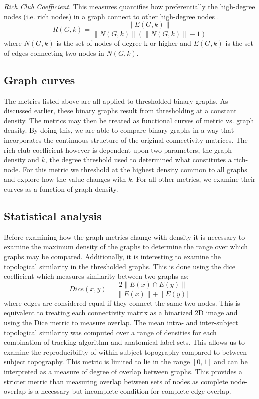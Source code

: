 \documentclass{frontiersSCNS} %
\begin{document}
\emph{Rich Club Coefficient}.
This measures quantifies how preferentially the high-degree nodes (i.e. rich nodes)  in a graph connect to other high-degree nodes \citep{Colizza2006}.
$$ R(G,k) = \frac{ \|E(G,k)\| }{ \|N(G,k)\| ( \|N(G,k)\|-1 ) } $$
where $N(G,k)$ is the set of nodes of degree k or higher and $E(G,k)$ is the set of edges connecting two nodes in $N(G,k)$.


\subsection{Graph curves}
The metrics listed above are all applied to thresholded binary graphs. As discussed earlier, these binary graphs result from thresholding at a constant density. The metrics may then be treated as functional curves of metric vs. graph density. By doing this, we are able to compare binary graphs in a way that incorporates the continuous structure of the original connectivity matrices. The rich club coefficient however is dependent upon two parameters, the graph density and $k$, the degree threshold used to determined what constitutes a rich-node. For this metric we threshold at the highest density common to all graphs and explore how the value changes with $k$. For all other metrics, we examine their curves as a function of graph density. 

\subsection{Statistical analysis}
Before examining how the graph metrics change with density it is necessary to examine the maximum density of the graphs to determine the range over which graphs may be compared. Additionally, it is interesting to examine the topological similarity in the thresholded graphs. This is done using the dice coefficient which measures similarity between two graphs as:
$$Dice(x,y) = \frac{ 2 \| E(x) \cap E(y) \| }{ \|E(x) \| + \| E(y) |\ }$$
where edges are considered equal if they connect the same two
nodes. This is equivalent to treating each connectivity matrix as
a binarized 2D image and using the Dice metric to measure overlap. The mean intra- and inter-subject topological similarity 
was computed over a range of densities for each combination of tracking algorithm and anatomical label sets. This allows us to 
examine the reproducibility of within-subject topography compared to between subject topography. This metric is limited to lie in the range $[0,1]$ and can be interpreted as a measure of degree of overlap between graphs. This provides a stricter metric than measuring overlap between sets of nodes as complete node-overlap is a necessary but incomplete condition for complete edge-overlap.
\end{document}
